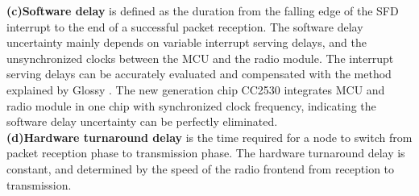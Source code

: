 \documentclass[conference]{IEEEtran}
\begin{document}
\indent \textbf{(c)Software delay} is defined as the duration from the falling edge of the SFD interrupt to the end of a successful packet reception.
The software delay uncertainty mainly depends on variable interrupt serving delays, and the unsynchronized clocks between the MCU and the radio module.
The interrupt serving delays can be accurately evaluated and compensated with the method explained by Glossy \cite{ferrari11Glossy}.
The new generation chip CC2530 integrates MCU and radio module in one chip with synchronized clock frequency, indicating the software delay uncertainty can be perfectly eliminated.\\
\indent \textbf{(d)Hardware turnaround delay} is the time required for a node to switch from packet reception phase to transmission phase.
The hardware turnaround delay is constant, and determined by the speed of the radio frontend from reception to transmission.
\end{document}

